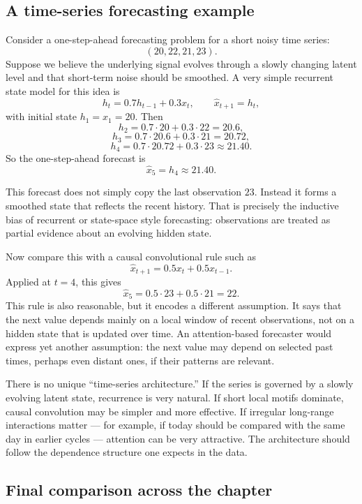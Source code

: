 \subsection*{A time-series forecasting example}

Consider a one-step-ahead forecasting problem for a short noisy time series:
\[
(20,22,21,23).
\]
Suppose we believe the underlying signal evolves through a slowly changing latent level and that short-term noise should be smoothed.
A very simple recurrent state model for this idea is
\[
h_t = 0.7 h_{t-1} + 0.3 x_t,
\qquad \hat{x}_{t+1}=h_t,
\]
with initial state $h_1=x_1=20$.
Then
\[
h_2 = 0.7\cdot 20 + 0.3\cdot 22 = 20.6,
\]
\[
h_3 = 0.7\cdot 20.6 + 0.3\cdot 21 = 20.72,
\]
\[
h_4 = 0.7\cdot 20.72 + 0.3\cdot 23 \approx 21.40.
\]
So the one-step-ahead forecast is
\[
\hat{x}_5 = h_4 \approx 21.40.
\]

This forecast does not simply copy the last observation $23$.
Instead it forms a smoothed state that reflects the recent history.
That is precisely the inductive bias of recurrent or state-space style forecasting: observations are treated as partial evidence about an evolving hidden state.

Now compare this with a causal convolutional rule such as
\[
\hat{x}_{t+1} = 0.5x_t + 0.5x_{t-1}.
\]
Applied at $t=4$, this gives
\[
\hat{x}_5 = 0.5\cdot 23 + 0.5\cdot 21 = 22.
\]
This rule is also reasonable, but it encodes a different assumption.
It says that the next value depends mainly on a local window of recent observations, not on a hidden state that is updated over time.
An attention-based forecaster would express yet another assumption: the next value may depend on selected past times, perhaps even distant ones, if their patterns are relevant.

\begin{example}
There is no unique ``time-series architecture.''
If the series is governed by a slowly evolving latent state, recurrence is very natural.
If short local motifs dominate, causal convolution may be simpler and more effective.
If irregular long-range interactions matter --- for example, if today should be compared with the same day in earlier cycles --- attention can be very attractive.
The architecture should follow the dependence structure one expects in the data.
\end{example}

\subsection*{Final comparison across the chapter}


